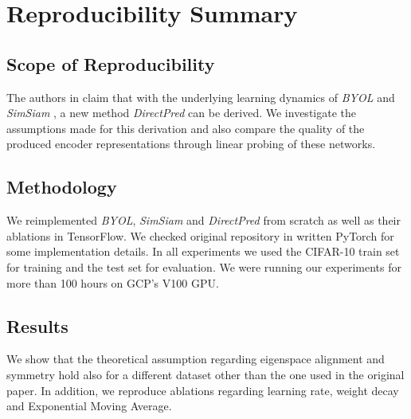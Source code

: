 \section*{Reproducibility Summary}

\subsection*{Scope of Reproducibility}

The authors in \cite{tian2021understanding} claim that with the underlying learning dynamics of \emph{BYOL} \cite{grill2020bootstrap} and \emph{SimSiam} \cite{chen2020exploring}, a new method \emph{DirectPred} can be derived. We investigate the assumptions made for this derivation and also compare the quality of the produced encoder representations through linear probing of these networks.

\subsection*{Methodology}


We reimplemented \emph{BYOL}, \emph{SimSiam} and \emph{DirectPred} from scratch as well as their ablations in TensorFlow. We checked original repository in written PyTorch for some implementation details. In all experiments we used the CIFAR-10 train set for training and the test set for evaluation. We were running our experiments for more than 100 hours on GCP's V100 GPU. 

\subsection*{Results}


We show that the theoretical assumption regarding eigenspace alignment and symmetry hold also for a different dataset other than the one used in the original paper. In addition, we reproduce ablations regarding learning rate, weight decay and Exponential Moving Average. 

